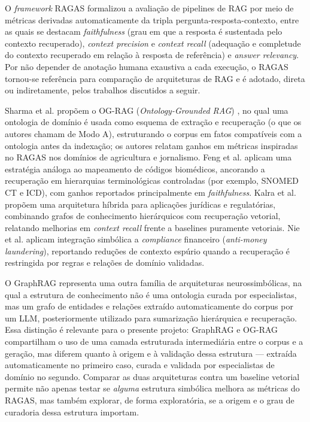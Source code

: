 \documentclass{article}
\begin{document}
O \textit{framework} RAGAS \cite{es-etal-2024-ragas} formalizou a avaliação de pipelines de RAG por meio de métricas derivadas automaticamente da tripla pergunta-resposta-contexto, entre as quais se destacam \textit{faithfulness} (grau em que a resposta é sustentada pelo contexto recuperado), \textit{context precision} e \textit{context recall} (adequação e completude do contexto recuperado em relação à resposta de referência) e \textit{answer relevancy}. Por não depender de anotação humana exaustiva a cada execução, o RAGAS tornou-se referência para comparação de arquiteturas de RAG e é adotado, direta ou indiretamente, pelos trabalhos discutidos a seguir.

Sharma et al. propõem o OG-RAG (\textit{Ontology-Grounded RAG}) \cite{sharma2025ograg}, no qual uma ontologia de domínio é usada como esquema de extração e recuperação (o que os autores chamam de Modo A), estruturando o corpus em fatos compatíveis com a ontologia antes da indexação; os autores relatam ganhos em métricas inspiradas no RAGAS nos domínios de agricultura e jornalismo. Feng et al. \cite{feng2025ontologyrag} aplicam uma estratégia análoga ao mapeamento de códigos biomédicos, ancorando a recuperação em hierarquias terminológicas controladas (por exemplo, SNOMED CT e ICD), com ganhos reportados principalmente em \textit{faithfulness}. Kalra et al. \cite{kalra2024hyparag} propõem uma arquitetura híbrida para aplicações jurídicas e regulatórias, combinando grafos de conhecimento hierárquicos com recuperação vetorial, relatando melhorias em \textit{context recall} frente a baselines puramente vetoriais. Nie et al. \cite{nie2025aml} aplicam integração simbólica a \textit{compliance} financeiro (\textit{anti-money laundering}), reportando reduções de contexto espúrio quando a recuperação é restringida por regras e relações de domínio validadas.

O GraphRAG \cite{edge2024graphrag} representa uma outra  família de arquiteturas neurossimbólicas, na qual a estrutura de conhecimento não é uma ontologia curada por especialistas, mas um grafo de entidades e relações extraído automaticamente do corpus por um LLM, posteriormente utilizado para sumarização hierárquica e recuperação. Essa distinção é relevante para o presente projeto: GraphRAG e OG-RAG compartilham o uso de uma camada estruturada intermediária entre o corpus e a geração, mas diferem quanto à origem e à validação dessa estrutura --- extraída automaticamente no primeiro caso, curada e validada por especialistas de domínio no segundo. Comparar as duas arquiteturas contra um baseline vetorial permite não apenas testar se \emph{alguma} estrutura simbólica melhora as métricas do RAGAS, mas também explorar, de forma exploratória, se a origem e o grau de curadoria dessa estrutura importam.
\end{document}
